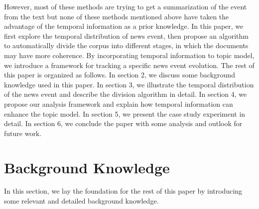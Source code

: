 \documentclass[runningheads,a4paper]{llncs}
\begin{document}
However, most of these methods are trying to get a summarization of the event from the text but none of these methods mentioned above have taken the advantage of the temporal information as a prior knowledge. In this paper, we first explore the temporal distribution of news event, then propose an algorithm to automatically divide the corpus into different stages, in which the documents may have more coherence. By incorporating temporal information to topic model, we introduce a framework for tracking a specific news event evolution. The rest of this paper is organized as follows. In section 2, we discuss some background knowledge used in this paper. In section 3, we illustrate the temporal distribution of the news event and describe the division algorithm in detail. In section 4, we propose our analysis framework and explain how temporal information can enhance the topic model. In section 5, we present the case study experiment in detail. In section 6, we conclude the paper with some analysis and outlook for future work.

\section{Background Knowledge}
\label{background knowledge}
In this section, we lay the foundation for the rest of this paper by introducing some relevant and detailed background knowledge.
\end{document}
